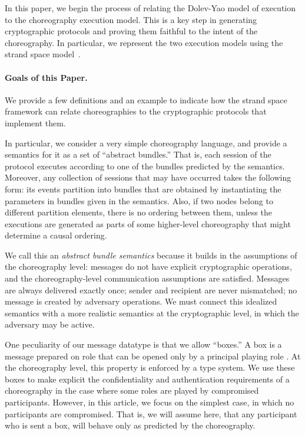 \documentclass[copyright]{eptcs}
\begin{document}
In this paper, we begin the process of relating the Dolev-Yao model of
execution to the choreography execution model.  This is a key step in
generating cryptographic protocols and proving them faithful to the
intent of the choreography.  In particular, we represent the two
execution models using the strand space
model~\cite{strandspaces,GuttmanEtAl05}.


\paragraph{Goals of this Paper.} We provide a few definitions and
an example to indicate how the strand space framework can relate
choreographies to the cryptographic protocols that implement them.

In particular, we consider a very simple choreography language, and
provide a semantics for it as a set of ``abstract bundles.''  That is,
each session of the protocol executes according to one of the bundles
predicted by the semantics.  Moreover, any collection of sessions that
may have occurred takes the following form: its events partition into
bundles that are obtained by instantiating the parameters in bundles
given in the semantics.  Also, if two nodes belong to different
partition elements, there is no  ordering between them,
unless the executions are generated as parts of some higher-level
choreography that might determine a causal ordering.

We call this an {\em abstract bundle semantics} because it builds in
the assumptions of the choreography level: messages do not have
explicit cryptographic operations, and the choreography-level
communication assumptions are satisfied.
Messages are always delivered exactly once; sender and recipient are
never mismatched; no message is created by adversary operations.  We
must connect this idealized semantics with a more realistic semantics
at the cryptographic level, in which the adversary may be active.

One peculiarity of our message datatype is that we allow ``boxes.''  A
box  is a message prepared on role
 that can be opened only by a principal playing role .
At the choreography level, this property is enforced by a type system.
We use these boxes to make explicit the confidentiality and
authentication requirements of a choreography in the case where some
roles are played by compromised participants.  However, in this
article, we focus on the simplest case, in which no participants are
compromised.  That is, we will assume here, that any participant who
is sent a box, will behave only as predicted by the choreography.
\end{document}
